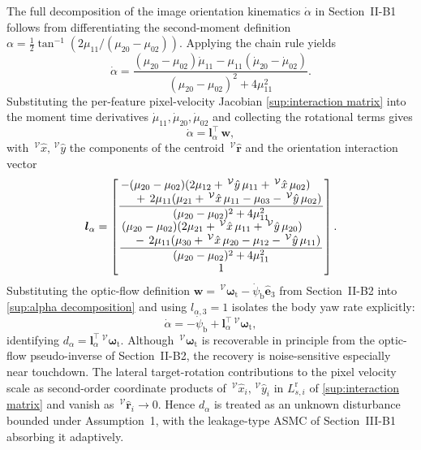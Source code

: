 \documentclass[10pt,journal]{IEEEtran}
\begin{document}
The full decomposition of the image orientation kinematics $\dot{\alpha}$ in Section~II-B1 follows from differentiating the second-moment definition $\alpha = \tfrac{1}{2}\tan^{-1}(2\mu_{11}/(\mu_{20}-\mu_{02}))$. Applying the chain rule yields
\begin{equation} \label{sup:alpha chain}
    \dot{\alpha} = \frac{(\mu_{20}-\mu_{02})\dot{\mu}_{11} - \mu_{11}(\dot{\mu}_{20}-\dot{\mu}_{02})}{(\mu_{20}-\mu_{02})^2 + 4\mu_{11}^2}.
\end{equation}
Substituting the per-feature pixel-velocity Jacobian \eqref{sup:interaction matrix} into the moment time derivatives $\dot{\mu}_{11},\dot{\mu}_{20},\dot{\mu}_{02}$ and collecting the rotational terms gives
\begin{equation} \label{sup:alpha decomposition}
    \dot{\alpha} = \boldsymbol{l}_\alpha^\top\,\boldsymbol{w},
\end{equation}
with $\,^\mathcal{V}\hat{x},\,^\mathcal{V}\hat{y}$ the components of the centroid $\,^\mathcal{V}\hat{\boldsymbol{r}}$ and the orientation interaction vector
\begin{equation} \label{sup:l alpha}
\boldsymbol{l}_\alpha = \begin{bmatrix}
\dfrac{\splitfrac{-(\mu_{20}-\mu_{02})(2\mu_{12} + \,^\mathcal{V}\hat{y}\,\mu_{11} + \,^\mathcal{V}\hat{x}\,\mu_{02})}{+\, 2\mu_{11}(\mu_{21} + \,^\mathcal{V}\hat{x}\,\mu_{11} - \mu_{03} - \,^\mathcal{V}\hat{y}\,\mu_{02})}}{(\mu_{20}-\mu_{02})^2 + 4\mu_{11}^2} \\[6pt]
\dfrac{\splitfrac{(\mu_{20}-\mu_{02})(2\mu_{21} + \,^\mathcal{V}\hat{x}\,\mu_{11} + \,^\mathcal{V}\hat{y}\,\mu_{20})}{-\, 2\mu_{11}(\mu_{30} + \,^\mathcal{V}\hat{x}\,\mu_{20} - \mu_{12} - \,^\mathcal{V}\hat{y}\,\mu_{11})}}{(\mu_{20}-\mu_{02})^2 + 4\mu_{11}^2} \\[6pt]
1
\end{bmatrix}.
\end{equation}
Substituting the optic-flow definition $\boldsymbol{w} = \,^\mathcal{V}\boldsymbol{\omega}_\text{t} - \dot{\psi}_\text{b}\hat{\boldsymbol{e}}_3$ from Section~II-B2 into \eqref{sup:alpha decomposition} and using $l_{\alpha,3}=1$ isolates the body yaw rate explicitly:
\begin{equation*}
    \dot{\alpha} = -\dot{\psi}_\text{b} + \boldsymbol{l}_\alpha^\top\,^\mathcal{V}\boldsymbol{\omega}_\text{t},
\end{equation*}
identifying $d_\alpha = \boldsymbol{l}_\alpha^\top\,^\mathcal{V}\boldsymbol{\omega}_\text{t}$. Although $\,^\mathcal{V}\boldsymbol{\omega}_\text{t}$ is recoverable in principle from the optic-flow pseudo-inverse of Section~II-B2, the recovery is noise-sensitive especially near touchdown. The lateral target-rotation contributions to the pixel velocity scale as second-order coordinate products of $\,^\mathcal{V}\hat{x}_i,\,^\mathcal{V}\hat{y}_i$ in $L_{s,i}^\text{r}$ of \eqref{sup:interaction matrix} and vanish as $\,^\mathcal{V}\hat{\boldsymbol{r}}_i \to 0$. Hence $d_\alpha$ is treated as an unknown disturbance bounded under Assumption~1, with the leakage-type ASMC of Section~III-B1 absorbing it adaptively.
\end{document}
